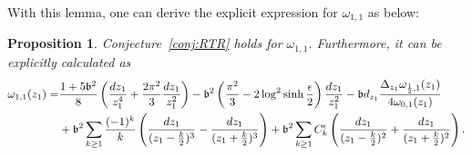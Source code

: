 \documentclass[12pt]{amsart}
\theoremstyle{plain}
\newtheorem{proposition}[theorem]{Proposition}
\theoremstyle{definition}
\theoremstyle{remark}
\numberwithin{equation}{section}
\begin{document}
With this lemma, one can derive the explicit expression for  $\omega_{1,1}$ as below: 

\begin{proposition}\label{prop:1,1}
Conjecture~\ref{conj:RTR} holds for $\omega_{1,1}$. Furthermore, it can be explicitly calculated as
\begin{align}
\omega_{1,1}(z_1)=&\frac{1+5\mathfrak{b}^2}{8}\left(\frac{dz_1}{z_1^4}+\frac{2\pi^2}{3}\frac{dz_1}{z_1^2}\right)-\mathfrak{b}^2\left(\frac{\pi^2}{3}-2\log^2\sinh\frac{\epsilon}{2}\right)\frac{dz_1}{z_1^2}
-\mathfrak{b}d_{z_1}\frac{\Delta_{z_1}\omega_{\frac12,1}(z_1)}{4\omega_{0,1}(z_1)}\nonumber\\
&+\mathfrak{b}^2\sum_{k\geq1}\frac{(-1)^k}{k}\left(\frac{dz_1}{(z_1-\frac{k}{2})^3}-\frac{dz_1}{(z_1+\frac{k}{2})^3}\right)+\mathfrak{b}^2\sum_{k\geq1}C_k^\epsilon\left(\frac{dz_1}{(z_1-\frac{k}{2})^2}+\frac{dz_1}{(z_1+\frac{k}{2})^2}\right)\label{explicit w_{1,1}}.
\end{align}
\end{proposition}
\end{document}
